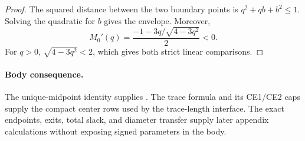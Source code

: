\begin{proof}
The squared distance between the two boundary points is
$q^2+qb+b^2\le1$.  Solving the quadratic for $b$ gives the envelope.
Moreover,
\[
 M_0'(q)=\frac{-1-3q/\sqrt{4-3q^2}}2<0.
\]
For $q>0$, $\sqrt{4-3q^2}<2$, which gives both strict linear comparisons.
\end{proof}

\paragraph{Body consequence.}
The unique-midpoint identity supplies
.  The trace formula and its CE1/CE2 caps
supply the compact center rows used by the trace-length interface.  The
exact endpoints, exits, total slack, and diameter transfer supply later
appendix calculations without exposing signed parameters in the body.
